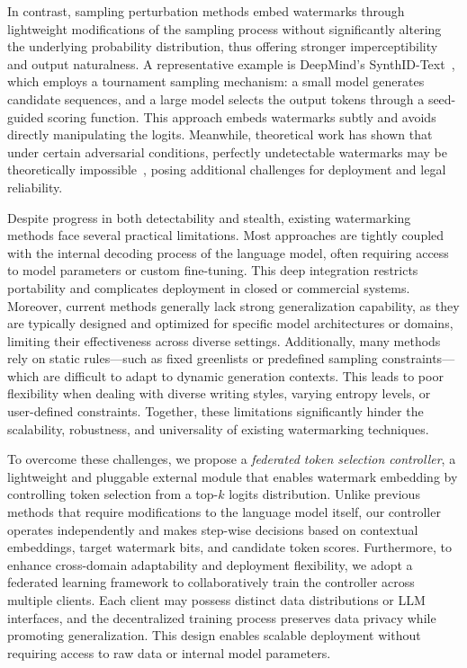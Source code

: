 \documentclass{article}
\begin{document}
In contrast, sampling perturbation methods embed watermarks through lightweight modifications of the sampling process without significantly altering the underlying probability distribution, thus offering stronger imperceptibility and output naturalness. A representative example is DeepMind’s SynthID-Text~\cite{deepmind2023synthid}, which employs a tournament sampling mechanism: a small model generates candidate sequences, and a large model selects the output tokens through a seed-guided scoring function. This approach embeds watermarks subtly and avoids directly manipulating the logits. Meanwhile, theoretical work has shown that under certain adversarial conditions, perfectly undetectable watermarks may be theoretically impossible~\cite{christ2023undetectable}, posing additional challenges for deployment and legal reliability.

Despite progress in both detectability and stealth, existing watermarking methods face several practical limitations. Most approaches are tightly coupled with the internal decoding process of the language model, often requiring access to model parameters or custom fine-tuning. This deep integration restricts portability and complicates deployment in closed or commercial systems. Moreover, current methods generally lack strong generalization capability, as they are typically designed and optimized for specific model architectures or domains, limiting their effectiveness across diverse settings. Additionally, many methods rely on static rules---such as fixed greenlists or predefined sampling constraints---which are difficult to adapt to dynamic generation contexts. This leads to poor flexibility when dealing with diverse writing styles, varying entropy levels, or user-defined constraints. Together, these limitations significantly hinder the scalability, robustness, and universality of existing watermarking techniques.

To overcome these challenges, we propose a \textit{federated token selection controller}, a lightweight and pluggable external module that enables watermark embedding by controlling token selection from a top-$k$ logits distribution. Unlike previous methods that require modifications to the language model itself, our controller operates independently and makes step-wise decisions based on contextual embeddings, target watermark bits, and candidate token scores. Furthermore, to enhance cross-domain adaptability and deployment flexibility, we adopt a federated learning framework to collaboratively train the controller across multiple clients. Each client may possess distinct data distributions or LLM interfaces, and the decentralized training process preserves data privacy while promoting generalization. This design enables scalable deployment without requiring access to raw data or internal model parameters.
\end{document}
